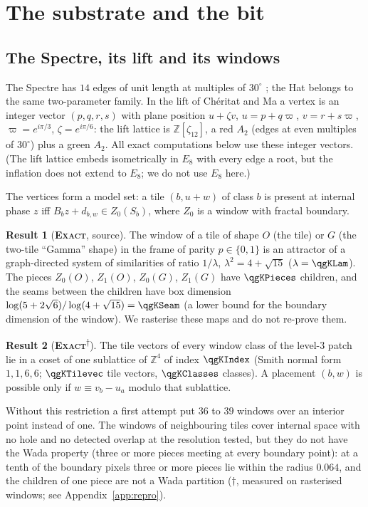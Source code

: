 \documentclass[11pt]{article}
\newcommand{\exact}{\textbf{\textsc{Exact}}}
\newcommand{\snap}{\textsuperscript{$\dagger$}}      %
\theoremstyle{definition}
\newtheorem{result}{Result}
\begin{document}
\section{The substrate and the bit}\label{sec:model}
\subsection{The Spectre, its lift and its windows}
The Spectre has $14$ edges of unit length at multiples of $30^\circ$ \cite{smith2023}; the Hat \cite{smith2024hat} belongs to the same two-parameter family. In the lift of Ch\'eritat and Ma \cite{cheritat2023} a vertex is an integer vector $(p,q,r,s)$ with plane position $u+\zeta v$, $u=p+q\varpi$, $v=r+s\varpi$, $\varpi=e^{i\pi/3}$, $\zeta=e^{i\pi/6}$: the lift lattice is $\mathbb{Z}[\zeta_{12}]$, a red $A_2$ (edges at even multiples of $30^\circ$) plus a green $A_2$. All exact computations below use these integer vectors. (The lift lattice embeds isometrically in $E_8$ with every edge a root, but the inflation does not extend to $E_8$; we do not use $E_8$ here.)

The vertices form a model set: a tile $(b,u{+}w)$ of class $b$ is present at internal phase $z$ iff $B_bz+d_{b,w}\in Z_0(S_b)$, where $Z_0$ is a window with fractal boundary.
\begin{result}[\exact, source]\label{res:window-pieces}
The window of a tile of shape $O$ (the tile) or $G$ (the two-tile ``Gamma'' shape) in the frame of parity $p\in\{0,1\}$ is an attractor of a graph-directed system of similarities of ratio $1/\lambda$, $\lambda^2=4+\sqrt{15}$ ($\lambda=\qgKLam$). The pieces $Z_0(O)$, $Z_1(O)$, $Z_0(G)$, $Z_1(G)$ have $\qgKPieces$ children, and the seams between the children have box dimension $\log(5+2\sqrt6)/\log(4+\sqrt{15})=\qgKSeam$ (a lower bound for the boundary dimension of the window). We rasterise these maps and do not re-prove them.
\end{result}
\begin{result}[\exact\snap]\label{res:index36}
The tile vectors of every window class of the level-$3$ patch lie in a coset of one sublattice of $\mathbb{Z}^4$ of index $\qgKIndex$ (Smith normal form $1,1,6,6$; $\qgKTilevec$ tile vectors, $\qgKClasses$ classes). A placement $(b,w)$ is possible only if $w\equiv v_b-u_a$ modulo that sublattice.
\end{result}
Without this restriction a first attempt put $36$ to $39$ windows over an interior point instead of one. The windows of neighbouring tiles cover internal space with no hole and no detected overlap at the resolution tested, but they do not have the Wada property (three or more pieces meeting at every boundary point): at a tenth of the boundary pixels three or more pieces lie within the radius $0.064$, and the children of one piece are not a Wada partition ($\dagger$, measured on rasterised windows; see Appendix~\ref{app:repro}).
\end{document}
